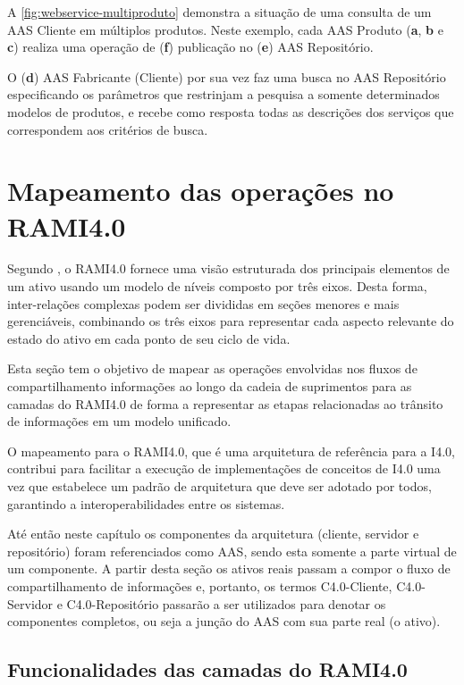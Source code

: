 A \autoref{fig:webservice-multiproduto} demonstra a situação de uma consulta de um AAS Cliente em múltiplos produtos. Neste exemplo, cada AAS Produto (\textbf{a}, \textbf{b} e \textbf{c}) realiza uma operação de (\textbf{f}) publicação no (\textbf{e}) AAS Repositório.

O (\textbf{d}) AAS Fabricante (Cliente) por sua vez faz uma busca no AAS Repositório especificando os parâmetros que restrinjam a pesquisa a somente determinados modelos de produtos, e recebe como resposta todas as descrições dos serviços que correspondem aos critérios de busca.

\section{Mapeamento das operações no RAMI4.0}

Segundo , o RAMI4.0 fornece uma visão estruturada dos principais elementos de um ativo usando um modelo de níveis composto por três eixos. Desta forma, inter-relações complexas podem ser divididas em seções menores e mais gerenciáveis, combinando os três eixos para representar cada aspecto relevante do estado do ativo em cada ponto de seu ciclo de vida.

Esta seção tem o objetivo de mapear as operações envolvidas nos fluxos de compartilhamento informações ao longo da cadeia de suprimentos para as camadas do RAMI4.0 de forma a representar as etapas relacionadas ao trânsito de informações em um modelo unificado.

O mapeamento para o RAMI4.0, que é uma arquitetura de referência para a I4.0, contribui para facilitar a execução de implementações de conceitos de I4.0 uma vez que estabelece um padrão de arquitetura que deve ser adotado por todos, garantindo a interoperabilidades entre os sistemas.

Até então neste capítulo os componentes da arquitetura (cliente, servidor e repositório) foram referenciados como AAS, sendo esta somente a parte virtual de um componente. A partir desta seção os ativos reais passam a compor o fluxo de compartilhamento de informações e, portanto, os termos C4.0-Cliente, C4.0-Servidor e C4.0-Repositório passarão a ser utilizados para denotar os componentes completos, ou seja a junção do AAS com sua parte real (o ativo).

\subsection{Funcionalidades das camadas do RAMI4.0}

